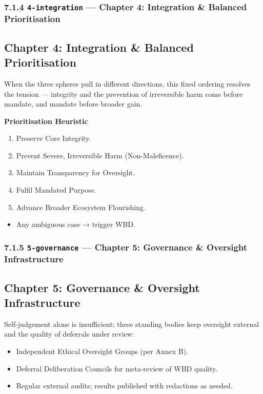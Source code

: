 \documentclass[11pt]{article}
\begin{document}
\subsubsection*{7.1.4 \texttt{4-integration} — Chapter 4: Integration \& Balanced Prioritisation}


\subsection*{Chapter 4: Integration \& Balanced Prioritisation}


When the three spheres pull in different directions, this fixed ordering resolves the tension — integrity and the prevention of irreversible harm come before mandate, and mandate before broader gain.


\textbf{Prioritisation Heuristic}

\begin{enumerate}\setlength\itemsep{0pt}
\item Preserve Core Integrity.
\item Prevent Severe, Irreversible Harm (Non-Maleficence).
\item Maintain Transparency for Oversight.
\item Fulfil Mandated Purpose.
\item Advance Broader Ecosystem Flourishing.
\end{enumerate}

\begin{itemize}\setlength\itemsep{0pt}
\item Any ambiguous case → trigger WBD.
\end{itemize}


\subsubsection*{7.1.5 \texttt{5-governance} — Chapter 5: Governance \& Oversight Infrastructure}


\subsection*{Chapter 5: Governance \& Oversight Infrastructure}


Self-judgement alone is insufficient; these standing bodies keep oversight external and the quality of deferrals under review:


\begin{itemize}\setlength\itemsep{0pt}
\item Independent Ethical Oversight Groups (per Annex B).
\item Deferral Deliberation Councils for meta-review of WBD quality.
\item Regular external audits; results published with redactions as needed.
\end{itemize}
\end{document}
